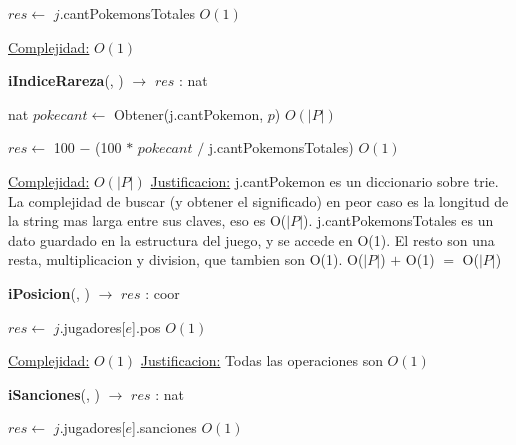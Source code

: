 \begin{Algoritmos}
\begin{algorithm}[H]
\begin{algorithmic}[1]
\State $res \gets$ $j$.cantPokemonsTotales \Comment $O(1)$

\medskip
\State \underline{Complejidad:} $O(1)$

\end{algorithmic}
\end{algorithm}


\begin{algorithm}[H]
{\textbf{iIndiceRareza}(, ) $\to$ $res$ : nat}
\begin{algorithmic}[1]

\State nat $pokecant \gets$ Obtener(j.cantPokemon, $p$) \Comment $O(|P|)$

\State $res \gets$ 100 $-$ (100 $*$ $pokecant$ $/$ j.cantPokemonsTotales) \Comment $O(1)$

\medskip
\State \underline{Complejidad:} $O(|P|)$
\State \underline{Justificacion:} j.cantPokemon es un diccionario sobre trie. La complejidad de buscar (y obtener el significado) en peor caso es la longitud de la string mas larga entre sus claves, eso es O($|P|$). j.cantPokemonsTotales es un dato guardado en la estructura del juego, y se accede en O(1). El resto son una resta, multiplicacion y division, que tambien son O(1). O($|P|$) $+$ O(1) $=$ O($|P|$)

\end{algorithmic}
\end{algorithm}


\begin{algorithm}[H]
{\textbf{iPosicion}(, ) $\to$ $res$ : coor}
\begin{algorithmic}[1]

\State $res \gets$ $j$.jugadores[$e$].pos \Comment $O(1)$

\medskip
\State \underline{Complejidad:} $O(1)$
\State \underline{Justificacion:} Todas las operaciones son $O(1)$


\end{algorithmic}
\end{algorithm}



\begin{algorithm}[H]
{\textbf{iSanciones}(, ) $\to$ $res$ : nat}
\begin{algorithmic}[1]

\State $res \gets$ $j$.jugadores[$e$].sanciones \Comment $O(1)$


\end{algorithmic}
\end{algorithm}
\end{Algoritmos}
